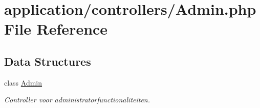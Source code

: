 \hypertarget{_admin_8php}{}\section{application/controllers/\+Admin.php File Reference}
\label{_admin_8php}
\subsection*{Data Structures}
\begin{DoxyCompactItemize}
\item 
class \mbox{\hyperlink{class_admin}{Admin}}
\begin{DoxyCompactList}\small\item\em Controller voor administratorfunctionaliteiten. \end{DoxyCompactList}\end{DoxyCompactItemize}
